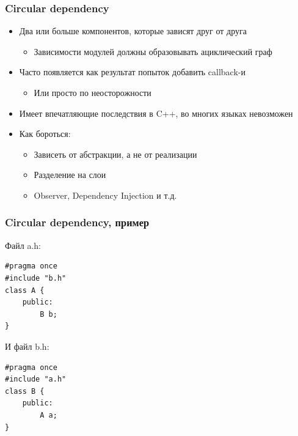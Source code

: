 \documentclass{../../slides-style}
\begin{document}
    \begin{frame}
        \frametitle{Circular dependency}
        \begin{itemize}
            \item Два или больше компонентов, которые зависят друг от друга
            \begin{itemize}
                \item Зависимости модулей должны образовывать ациклический граф
            \end{itemize}
            \item Часто появляется как результат попыток добавить callback-и
            \begin{itemize}
                \item Или просто по неосторожности
            \end{itemize}
            \item Имеет впечатляющие последствия в C++, во многих языках невозможен
            \item Как бороться:
            \begin{itemize}
                \item Зависеть от абстракции, а не от реализации
                \item Разделение на слои
                \item Observer, Dependency Injection и т.д.
            \end{itemize}
        \end{itemize}
    \end{frame}

    \begin{frame}[fragile]
        \frametitle{Circular dependency, пример}
        Файл a.h:
        \begin{verbatim}
#pragma once
#include "b.h"
class A {
    public:
        B b;
}
        \end{verbatim}
            
        И файл b.h:
            
        \begin{verbatim}
#pragma once
#include "a.h"
class B {
    public:
        A a;
}
        \end{verbatim}
    \end{frame}
\end{document}
